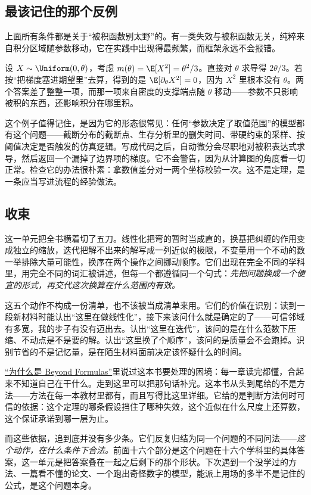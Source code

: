 \subsection{最该记住的那个反例}

上面所有条件都是关于``被积函数别太野''的。有一类失效与被积函数无关，纯粹来自积分区域随参数移动，它在实践中出现得最频繁，而框架永远不会报错。

设 \(X\sim\Uniform(0,\theta)\)，考虑 \(m(\theta)=\E[X^{2}]=\theta^{2}/3\)。直接对 \(\theta\) 求导得 \(2\theta/3\)。若按``把梯度塞进期望里''去算，得到的是 \(\E[\partial_\theta X^{2}]=0\)，因为 \(X^{2}\) 里根本没有 \(\theta\)。两个答案差了整整一项，而那一项来自密度的支撑端点随 \(\theta\) 移动——参数不只影响被积的东西，还影响积分在哪里积。

这个例子值得记住，是因为它的形态很常见：任何``参数决定了取值范围''的模型都有这个问题——截断分布的截断点、生存分析里的删失时间、带硬约束的采样、按阈值决定是否触发的仿真逻辑。写成代码之后，自动微分会尽职地对被积表达式求导，然后返回一个漏掉了边界项的梯度。它不会警告，因为从计算图的角度看一切正常。检查它的办法很朴素：拿数值差分对一两个坐标校验一次。这不是定理，是一条应当写进流程的经验做法。

\subsection{收束}

这一单元把全书横着切了五刀。线性化把弯的暂时当成直的，换基把纠缠的作用变成独立的缩放，迭代把解不出来的解写成一列近似的极限，不变量用一个不动的数一举排除大量可能性，换序在两个操作之间挪动顺序。它们出现在完全不同的学科里，用完全不同的词汇被讲述，但每一个都遵循同一个句式：\emph{先把问题换成一个便宜的形式，再交代这次换算在什么范围内有效。}

这五个动作不构成一份清单，也不该被当成清单来用。它们的价值在识别：读到一段新材料时能认出``这里在做线性化''，接下来该问什么就是确定的了——可信邻域有多宽，我的步子有没有迈出去。认出``这里在迭代''，该问的是在什么范数下压缩、不动点是不是要的解。认出``这里换了个顺序''，该问的是质量会不会跑掉。识别节省的不是记忆量，是在陌生材料面前决定该怀疑什么的时间。

\hyperref[ch:001]{``为什么是 Beyond Formulas''}里说过这本书要处理的困境：每一章读完都懂，合起来不知道自己在干什么。走到这里可以把那句话补完。这本书从头到尾给的不是方法——方法在每一本教材里都有，而且写得比这里详细。它给的是判断方法何时可信的依据：这个定理的哪条假设挡住了哪种失效，这个近似在什么尺度上还算数，这个保证承诺到哪一层为止。

而这些依据，追到底并没有多少条。它们反复归结为同一个问题的不同问法——\emph{这个动作，在什么条件下合法。}前面十六个部分是这个问题在十六个学科里的具体答案，这一单元是把答案叠在一起之后剩下的那个形状。下次遇到一个没学过的方法、一篇看不懂的论文、一个跑出奇怪数字的模型，能派上用场的多半不是记住的公式，是这个问题本身。
